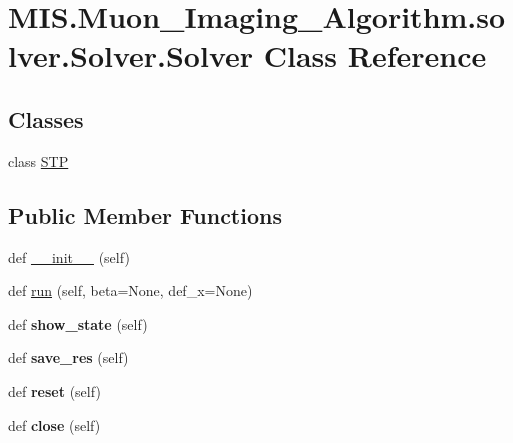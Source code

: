 \hypertarget{classMIS_1_1Muon__Imaging__Algorithm_1_1solver_1_1Solver_1_1Solver}{}\section{M\+I\+S.\+Muon\+\_\+\+Imaging\+\_\+\+Algorithm.\+solver.\+Solver.\+Solver Class Reference}
\label{classMIS_1_1Muon__Imaging__Algorithm_1_1solver_1_1Solver_1_1Solver}
\subsection*{Classes}
\begin{DoxyCompactItemize}
\item 
class \hyperlink{classMIS_1_1Muon__Imaging__Algorithm_1_1solver_1_1Solver_1_1Solver_1_1STP}{S\+TP}
\end{DoxyCompactItemize}
\subsection*{Public Member Functions}
\begin{DoxyCompactItemize}
\item 
def \hyperlink{classMIS_1_1Muon__Imaging__Algorithm_1_1solver_1_1Solver_1_1Solver_a055e6cca9674d55c1a3fe2d390029a7b}{\+\_\+\+\_\+init\+\_\+\+\_\+} (self)
\item 
def \hyperlink{classMIS_1_1Muon__Imaging__Algorithm_1_1solver_1_1Solver_1_1Solver_a297a4bb34bdb9a9661420e30aa512c92}{run} (self, beta=None, def\+\_\+x=None)
\item 
\mbox{\label{classMIS_1_1Muon__Imaging__Algorithm_1_1solver_1_1Solver_1_1Solver_a7fc54419a1cbcbdbde516ad2e605148a}} 
def {\bfseries show\+\_\+state} (self)
\item 
\mbox{\label{classMIS_1_1Muon__Imaging__Algorithm_1_1solver_1_1Solver_1_1Solver_a944d7df9c9015d5fea8d2a9d73925533}} 
def {\bfseries save\+\_\+res} (self)
\item 
\mbox{\label{classMIS_1_1Muon__Imaging__Algorithm_1_1solver_1_1Solver_1_1Solver_a80a5495e38bb14d9ff97fcc996d5a7da}} 
def {\bfseries reset} (self)
\item 
\mbox{\label{classMIS_1_1Muon__Imaging__Algorithm_1_1solver_1_1Solver_1_1Solver_a8b4a5af848dd68e714cd575b769f98fd}} 
def {\bfseries close} (self)
\end{DoxyCompactItemize}
